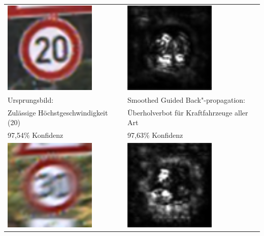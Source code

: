 \begin{table}
	\centering
	\begin{tabular}{p{}p{7cm}}
		\includegraphics[height=4.4cm]{Images/AnPe/5_2_Oben-links} & \includegraphics[height=4.4cm]{Images/AnPe/5_2_Oben_rechts} \\
		Ursprungsbild: & Smoothed Guided Back"-propagation:\\
		Zulässige Höchstgeschwindigkeit (20) & Überholverbot für Kraftfahrzeuge aller Art\\
		97,54\% Konfidenz & 97,63\% Konfidenz\\
		\includegraphics[height=4.4cm]{Images/AnPe/5_2_Mitte-links} &
		\includegraphics[height=4.4cm]{Images/AnPe/5_2_Mitte_rechts}  \\

\end{tabular}
\end{table}
